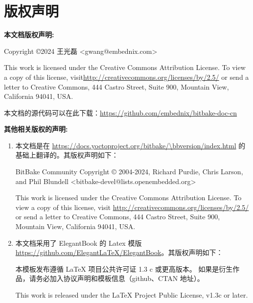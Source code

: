 \chapter*{版权声明}

\textbf{本文档版权声明:}

Copyright \copyright 2024 王光磊 <gwang@embednix.com>

This work is licensed under the Creative Commons Attribution License. To view a copy of this license, visit\linebreak \url{http://creativecommons.org/licenses/by/2.5/} or send a letter to Creative Commons, 444 Castro Street, Suite 900, Mountain View, California 94041, USA.

本文档的源代码可以在此下载：\url{https://github.com/embednix/bitbake-doc-cn}


\textbf{其他相关版权的声明:}

\begin{enumerate}    
\item 本文档是在 \url{https://docs.yoctoproject.org/bitbake/\bbversion/index.html} 的基础上翻译的。其版权声明如下：

\medskip
BitBake Community
Copyright © 2004-2024, Richard Purdie, Chris Larson, and Phil Blundell\linebreak
<bitbake-devel@lists.openembedded.org>

\medskip
This work is licensed under the Creative Commons Attribution License. To view a copy of this license, visit \linebreak \url{http://creativecommons.org/licenses/by/2.5/} or send a letter to Creative Commons, 444 Castro Street, Suite 900, Mountain View, California 94041, USA.

\medskip
\item 本文档采用了 ElegantBook 的 Latex 模版 \url{https://github.com/ElegantLaTeX/ElegantBook}。其版权声明如下：

\medskip
本模板发布遵循 LaTeX 项目公共许可证 1.3 c 或更高版本。 如果是衍生作品，请务必加入协议声明和模板信息（github、CTAN 地址）。

\medskip
This work is released under the LaTeX Project Public License, v1.3c or later.
\end{enumerate}



